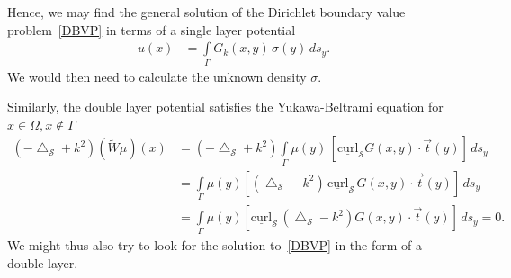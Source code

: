 \documentclass[final]{siamltex}
\newcommand{\lap}{\bigtriangleup}
\renewcommand{\S} {\mathcal{S}}
\begin{document}
Hence, we may find the general solution of the
Dirichlet boundary value problem~\eqref{DBVP} in terms of a single layer potential
\begin{align*}
  u(x) & =  \int\limits_\Gamma G_k(x,y) \,\sigma(y) \,ds_{y}. 
\end{align*}
We would then need to calculate the unknown density $\sigma$.
 
Similarly, the double layer potential satisfies the Yukawa-Beltrami
equation for $x\in \Omega, x\notin\Gamma$
\begin{align*}
(-\lap_{\S} + k^2)(\widetilde{W}\mu)(x) & = (-\lap_{\S}+k^2)
\int\limits_\Gamma \mu(y)\, [\underline{\mbox{curl}}_{\S}
G(x,y)\cdot\vec{t}(y)]\,ds_{y} \\
&=\int\limits_\Gamma \mu(y)
[(\lap_{\S}-k^2)\,\underline{\mbox{curl}}_{\S}\,
G(x,y)\cdot\vec{t}(y)]\,ds_{y} \\ 
&=\int\limits_\Gamma \mu(y) [\underline{\mbox{curl}}_{\S} \,
(\lap_{\S} -k^2)G(x,y)\cdot\vec{t}(y)]\,ds_{y} = 0.
\end{align*}
We might thus also try to look for the solution to~\eqref{DBVP} in the
form of a double layer.



\end{document}
